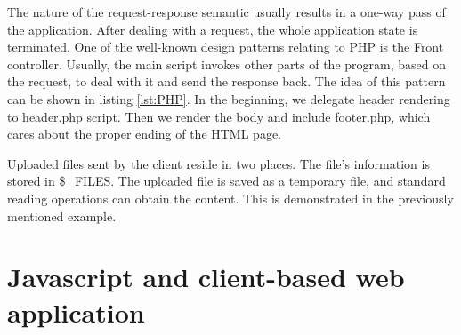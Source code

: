 \par
The nature of the request-response semantic usually results in a one-way pass of the application.
After dealing with a request, the whole application state is terminated.
One of the well-known design patterns relating to PHP is the Front controller.
Usually, the main script invokes other parts of the program, based on the request, to deal with it and send the response back.
The idea of this pattern can be shown in listing \ref{lst:PHP}.
In the beginning, we delegate header rendering to header.php script.
Then we render the body and include footer.php, which cares about the proper ending of the HTML page.
\par
Uploaded files sent by the client reside in two places.
The file's information is stored in \$\_FILES.
The uploaded file is saved as a temporary file, and standard reading operations can obtain the content.
This is demonstrated in the previously mentioned example.

\section{Javascript and client-based web application}

